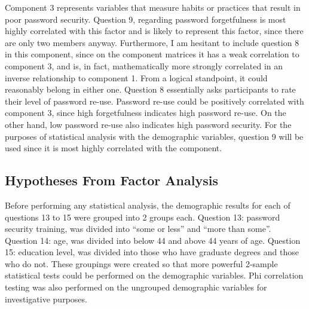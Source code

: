\documentclass[letterpaper, 10 pt, conference]{ieeeconf}  %
\begin{document}
Component 3 represents variables that measure habits or practices that result in poor password security. Question 9, regarding password forgetfulness is most highly correlated with this factor and is likely to represent this factor, since there are only two members anyway. Furthermore, I am hesitant to include question 8 in this component, since on the component matrices it has a weak correlation to component 3, and is, in fact, mathematically more strongly correlated in an inverse relationship to component 1. From a logical standpoint, it could reasonably belong in either one. Question 8 essentially asks participants to rate their level of password re-use. Password re-use could be positively correlated with component 3, since high forgetfulness indicates high password re-use. On the other hand, low password re-use also indicates high password security. For the purposes of statistical analysis with the demographic variables, question 9 will be used since it is most highly correlated with the component.

   

\subsection{Hypotheses From Factor Analysis}

Before performing any statistical analysis, the demographic results for each of questions 13 to 15 were grouped into 2 groups each. Question 13: password security training, was divided into “some or less” and “more than some”. Question 14: age, was divided into below 44 and above 44 years of age. Question 15: education level, was divided into those who have graduate degrees and those who do not. These groupings were created so that more powerful 2-sample statistical tests could be performed on the demographic variables. Phi correlation testing was also performed on the ungrouped demographic variables for investigative purposes.
\end{document}
